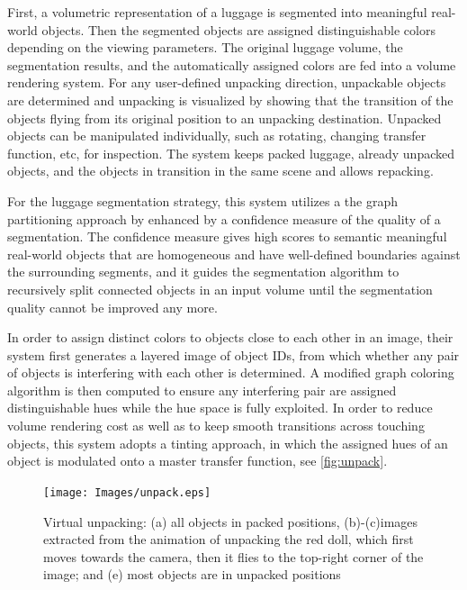 First, a volumetric representation of a luggage is
segmented into meaningful real-world objects. Then the segmented
objects are assigned distinguishable colors depending on the viewing
parameters. The original luggage volume, the segmentation
results, and the automatically assigned colors are fed into a volume
rendering system. For any user-defined unpacking direction,
unpackable objects are determined and unpacking is visualized by
showing that the transition of the objects flying from its original
position to an unpacking destination. Unpacked objects can be manipulated
individually, such as rotating, changing transfer function,
etc, for inspection. The system keeps packed luggage, already unpacked
objects, and the objects in transition in the same scene and
allows repacking.

For the luggage segmentation strategy, this system utilizes a the
graph partitioning approach by \cite{1580491} enhanced
by a confidence measure of the quality of a segmentation. The
confidence measure gives high scores to semantic meaningful real-world
objects that are homogeneous and have well-defined boundaries
against the surrounding segments, and it guides the segmentation algorithm to recursively split connected objects in an input
volume until the segmentation quality cannot be improved any more.

In order to assign distinct colors to objects close to each other in
an image, their system first generates a layered image of object IDs,
from which whether any pair of objects is interfering with each other
is determined. A modified graph coloring algorithm is then computed
to ensure any interfering pair are assigned distinguishable
hues while the hue space is fully exploited. In order to reduce volume rendering cost as well as to keep smooth transitions across
touching objects, this system adopts a tinting approach, in which the assigned
hues of an object is modulated onto a master transfer function, see \autoref{fig:unpack}.


\begin{figure}
\centering
\texttt{[image: Images/unpack.eps]}
\caption[ unpack]{Virtual unpacking: (a) all objects in packed positions, (b)-(c)images extracted from the animation of unpacking the red doll, which
first moves towards the camera, then it flies to the top-right corner of the image; and (e) most objects are in unpacked positions}
\label{fig:unpack}
\end{figure}





